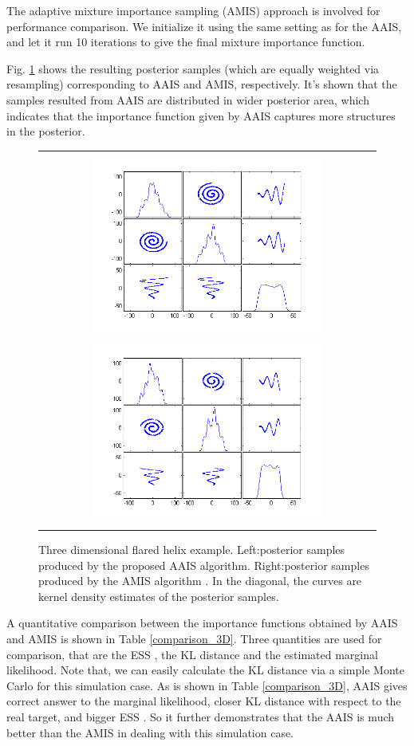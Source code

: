 \documentclass[aoas]{imsart}
\def\ESS{\textsf{ESS }}
\begin{document}
The adaptive mixture importance sampling (AMIS) approach
\cite{cappe2008ais} is involved for performance comparison. We
initialize it using the same setting as for the AAIS, and let it run
10 iterations to give the final mixture importance function.

Fig. \ref{fig:helix_scatter} shows the resulting posterior samples
(which are equally weighted via resampling) corresponding to AAIS
and AMIS, respectively. It's shown that the samples resulted from
AAIS are distributed in wider posterior area, which indicates that
the importance function given by AAIS captures more structures in
the posterior.

\begin{figure}[!htb]
\begin{tabular}{c}
\centerline{\includegraphics[width=3in,height=2.4in]{Fig/flared_helix_scatter.png}\includegraphics[width=3in,height=2.4in]{Fig/AIS_3d_felix_scatter.png}}
\end{tabular}
\caption{Three dimensional flared helix example. Left:posterior
samples produced by the proposed AAIS algorithm. Right:posterior
samples produced by the AMIS algorithm \citep{cappe2008ais}. In the
diagonal, the curves are kernel density estimates of the posterior
samples.} \label{fig:helix_scatter}
\end{figure}

A quantitative comparison between the importance functions obtained
by AAIS and AMIS is shown in Table \ref{comparison_3D}. Three
quantities are used for comparison, that are the \ESS, the KL
distance and the estimated marginal likelihood. Note that, we can
easily calculate the KL distance via a simple Monte Carlo for this
simulation case. As is shown in Table \ref{comparison_3D}, AAIS
gives correct answer to the marginal likelihood, closer KL distance
with respect to the real target, and bigger \ESS. So it further
demonstrates that the AAIS is much better than the AMIS in dealing
with this simulation case.
\end{document}
